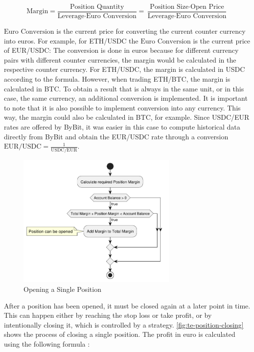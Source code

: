 \[
    \text{Margin} = \frac{\text{Position Quantity}}{\text{Leverage} \cdot \text{Euro Conversion}} = \frac{\text{Position Size} \cdot \text{Open Price}}{\text{Leverage} \cdot \text{Euro Conversion}}
\]

\noindent
$\text{Euro Conversion}$ is the current price for converting the current counter currency into euros.
For example, for ETH/USDC the $\text{Euro Conversion}$ is the current price of EUR/USDC:
The conversion is done in euros because for different currency pairs with different counter currencies, the margin would be calculated in the respective counter currency.
For ETH/USDC, the margin is calculated in USDC according to the formula.
However, when trading ETH/BTC, the margin is calculated in BTC.
To obtain a result that is always in the same unit, or in this case, the same currency, an additional conversion is implemented.
It is important to note that it is also possible to implement conversion into any currency.
This way, the margin could also be calculated in BTC, for example.
Since USDC/EUR rates are offered by ByBit, it was easier in this case to compute historical data directly from ByBit and obtain the EUR/USDC rate through a conversion $\text{EUR/USDC} = \frac{1}{\text{USDC/EUR}}$.

\begin{figure}[H]
    \centering
    \includegraphics[width=0.7\textwidth]{images/trading-engine/position-opening}
    \caption{Opening a Single Position}
    \label{fig:te-position-opening}
\end{figure}

\noindent
After a position has been opened, it must be closed again at a later point in time.
This can happen either by reaching the stop loss or take profit, or by intentionally closing it, which is controlled by a strategy.
\autoref{fig:te-position-closing} shows the process of closing a single position.
The profit in euro is calculated using the following formula \cite{margin-calculation}:

